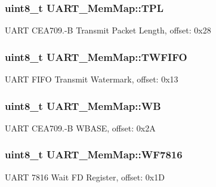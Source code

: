 \subsubsection[{T\+P\+L}]{\setlength{\rightskip}{0pt plus 5cm}uint8\+\_\+t U\+A\+R\+T\+\_\+\+Mem\+Map\+::\+T\+P\+L}\label{struct_u_a_r_t___mem_map_aaef0682db07857a89bbc31b6436126cd}
U\+A\+R\+T C\+E\+A709.-\/\+B Transmit Packet Length, offset\+: 0x28 \hypertarget{struct_u_a_r_t___mem_map_a4c4b96943ef98aa41f68416b2789d190}{}
\subsubsection[{T\+W\+F\+I\+F\+O}]{\setlength{\rightskip}{0pt plus 5cm}uint8\+\_\+t U\+A\+R\+T\+\_\+\+Mem\+Map\+::\+T\+W\+F\+I\+F\+O}\label{struct_u_a_r_t___mem_map_a4c4b96943ef98aa41f68416b2789d190}
U\+A\+R\+T F\+I\+F\+O Transmit Watermark, offset\+: 0x13 \hypertarget{struct_u_a_r_t___mem_map_a43388b5bf30b9bf24297057d30ac0596}{}
\subsubsection[{W\+B}]{\setlength{\rightskip}{0pt plus 5cm}uint8\+\_\+t U\+A\+R\+T\+\_\+\+Mem\+Map\+::\+W\+B}\label{struct_u_a_r_t___mem_map_a43388b5bf30b9bf24297057d30ac0596}
U\+A\+R\+T C\+E\+A709.-\/\+B W\+B\+A\+S\+E, offset\+: 0x2\+A \hypertarget{struct_u_a_r_t___mem_map_afd05a5c4ba0ae69c16ca9b6cd578a726}{}
\subsubsection[{W\+F7816}]{\setlength{\rightskip}{0pt plus 5cm}uint8\+\_\+t U\+A\+R\+T\+\_\+\+Mem\+Map\+::\+W\+F7816}\label{struct_u_a_r_t___mem_map_afd05a5c4ba0ae69c16ca9b6cd578a726}
U\+A\+R\+T 7816 Wait F\+D Register, offset\+: 0x1\+D \hypertarget{struct_u_a_r_t___mem_map_aed09f864d4f1afe57f146ff72949c3d2}{}
